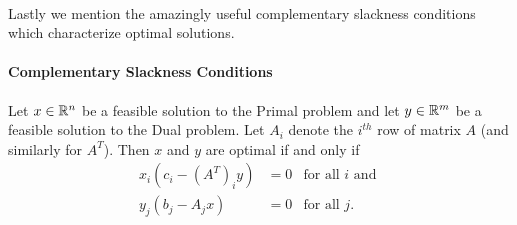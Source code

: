\documentclass[letterpaper,12pt,oneside,onecolumn]{article}
\begin{document}
\paragraph{}
Lastly we mention the amazingly useful complementary slackness conditions which characterize optimal solutions.
\paragraph{Complementary Slackness Conditions}
Let $x \in \mathbb{R}^n$ be a feasible solution to the Primal problem and let $y\in \mathbb{R}^m$ be a feasible solution to the Dual problem. Let $A_i$ denote the $i^{th}$ row of matrix $A$ (and similarly for $A^T$). Then $x$ and $y$ are optimal if and only if
\begin{align*}
x_i(c_i - (A^T)_i y) &= 0 &\text{for all $i$ and }\\
y_j(b_j - A_j x) &= 0 &\text{for all $j$}.
\end{align*}
\end{document}
